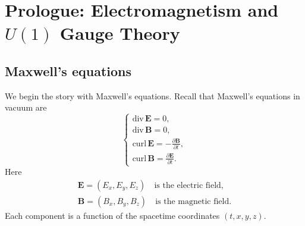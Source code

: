 \section{Prologue: Electromagnetism and $U(1)$ Gauge Theory}
\subsection{Maxwell's equations}
We begin the story with Maxwell's equations. Recall that Maxwell's equations in vacuum are 
\begin{equation*}
    \begin{cases}
        \mathrm{div}\, \mathbf{E} = 0, \\
        \mathrm{div}\, \mathbf{B} = 0, \\
        \mathrm{curl}\, \mathbf{E} = -\frac{\partial \mathbf{B}}{\partial t}, \\
        \mathrm{curl}\, \mathbf{B} = \frac{\partial \mathbf{E}}{\partial t}.
    \end{cases}
\end{equation*}
Here 
\begin{gather*}
    \mathbf{E} = (E_x, E_y, E_z) \quad \text{is the electric field}, \\
    \mathbf{B} = (B_x, B_y, B_z) \quad \text{is the magnetic field}.
\end{gather*}
Each component is a function of the spacetime coordinates $(t, x, y, z)$. 


